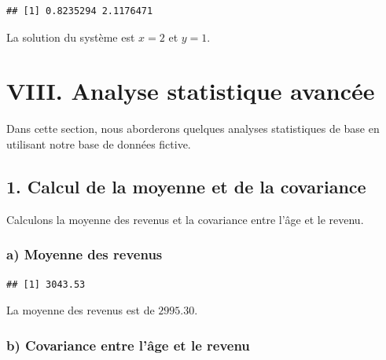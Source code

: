 \documentclass[
]{article}
\newenvironment{Shaded}{\begin{snugshade}}{\end{snugshade}}
\newcommand{\FunctionTok}[1]{\textcolor[rgb]{0.13,0.29,0.53}{\textbf{#1}}}
\newcommand{\NormalTok}[1]{#1}
\newcommand{\OtherTok}[1]{\textcolor[rgb]{0.56,0.35,0.01}{#1}}
\newcommand{\SpecialCharTok}[1]{\textcolor[rgb]{0.81,0.36,0.00}{\textbf{#1}}}
\begin{document}
\begin{verbatim}
## [1] 0.8235294 2.1176471
\end{verbatim}

La solution du système est \(x = 2\) et \(y = 1\).

\hypertarget{viii.-analyse-statistique-avancuxe9e}{%
\section{VIII. Analyse statistique
avancée}\label{viii.-analyse-statistique-avancuxe9e}}

Dans cette section, nous aborderons quelques analyses statistiques de
base en utilisant notre base de données fictive.

\hypertarget{calcul-de-la-moyenne-et-de-la-covariance}{%
\subsection{1. Calcul de la moyenne et de la
covariance}\label{calcul-de-la-moyenne-et-de-la-covariance}}

Calculons la moyenne des revenus et la covariance entre l'âge et le
revenu.

\hypertarget{a-moyenne-des-revenus}{%
\subsubsection{a) Moyenne des revenus}\label{a-moyenne-des-revenus}}

\begin{Shaded}
\end{Shaded}

\begin{verbatim}
## [1] 3043.53
\end{verbatim}

La moyenne des revenus est de \textbf{\(2995.30\)}.

\hypertarget{b-covariance-entre-luxe2ge-et-le-revenu}{%
\subsubsection{b) Covariance entre l'âge et le
revenu}\label{b-covariance-entre-luxe2ge-et-le-revenu}}
\end{document}

